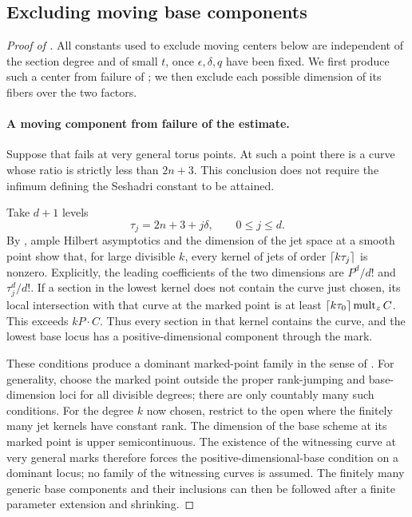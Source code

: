 \subsection{Excluding moving base components}

\begin{proof}[Proof of ]
All constants used to exclude moving centers below are independent
of the section degree and of small \(t\), once
\(\epsilon,\delta,q\) have been fixed. We first produce such a center
from failure of ; we then exclude each
possible dimension of its fibers over the two factors.

\paragraph{A moving component from failure of the estimate.}
Suppose that  fails at very general
torus points. At such a point there is a curve whose ratio is
strictly less than \(2n+3\). This conclusion does not require the
infimum defining the Seshadri constant to be attained.

Take \(d+1\) levels
\[
 \tau_j=2n+3+j\delta,\qquad 0\le j\le d .
\]
By , ample Hilbert asymptotics and the
dimension of the jet space at a smooth point show that, for large
divisible \(k\), every kernel of jets of order
\(\lceil k\tau_j\rceil\) is nonzero. Explicitly, the leading coefficients
of the two dimensions are \(P^d/d!\) and \(\tau_j^d/d!\).
If a section in the lowest kernel does not contain the curve just
chosen, its local intersection with that curve at the marked point
is at least
\(\lceil k\tau_0\rceil\operatorname{mult}_z C\). This exceeds \(kP\cdot C\).
Thus every section in that kernel contains the curve, and the
lowest base locus has a positive-dimensional component through the
mark.

These conditions produce a dominant marked-point family in the
sense of . For generality, choose the
marked point outside the proper
rank-jumping and base-dimension loci for all divisible degrees; there
are only countably many such conditions. For the degree \(k\) now
chosen, restrict to the open where the finitely many jet kernels have
constant rank. The dimension of the base
scheme at its marked point is upper semicontinuous. The existence
of the witnessing curve at very general marks therefore forces the
positive-dimensional-base condition on a dominant locus; no family
of the witnessing curves is assumed. The finitely many generic
base components and their inclusions can then be followed after a
finite parameter extension and shrinking.


\end{proof}
